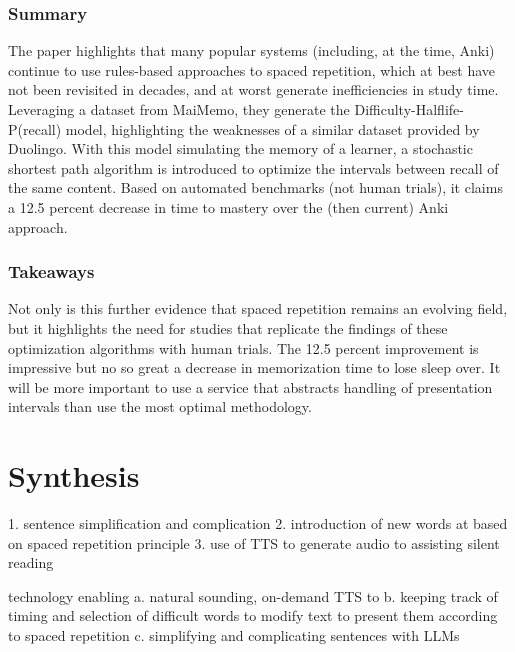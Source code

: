\documentclass[
	letterpaper, %
]{jdf}
\begin{document}
\subsubsection{Summary}
The paper highlights that many popular systems (including, at the time, Anki) continue to use rules-based approaches to spaced repetition, which at best have not been revisited in decades, and at worst generate inefficiencies in study time. Leveraging a dataset from MaiMemo, they generate the Difficulty-Halflife-P(recall) model, highlighting the weaknesses of a similar dataset provided by Duolingo. With this model simulating the memory of a learner, a stochastic shortest path algorithm is introduced to optimize the intervals between recall of the same content. Based on automated benchmarks (not human trials), it claims a 12.5 percent decrease in time to mastery over the (then current) Anki approach.

\subsubsection{Takeaways}
Not only is this further evidence that spaced repetition remains an evolving field, but it highlights the need for studies that replicate the findings of these optimization algorithms with human trials. The 12.5 percent improvement is impressive but no so great a decrease in memorization time to lose sleep over. It will be more important to use a service that abstracts handling of presentation intervals than use the most optimal methodology.

\section{Synthesis}
1. sentence simplification and complication
2. introduction of new words at based on spaced repetition principle
3. use of TTS to generate audio to assisting silent reading

technology enabling
a. natural sounding, on-demand TTS to
b. keeping track of timing and selection of difficult words to modify text to present them according to spaced repetition
c. simplifying and complicating sentences with LLMs
\end{document}
